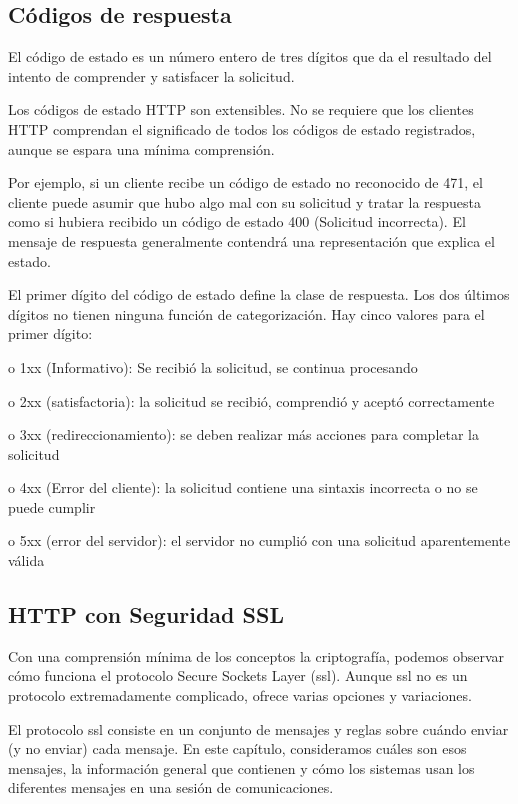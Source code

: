 \subsection{Códigos de respuesta} 
El código de estado es un número entero de tres dígitos que da el 
resultado del intento de comprender y satisfacer la solicitud.

   Los códigos de estado HTTP son extensibles. No se requiere que los
    clientes HTTP comprendan el significado de todos los códigos de
     estado registrados, aunque se espara una mínima comprensión.

   Por ejemplo, si un cliente recibe un código de estado no reconocido
    de 471, el cliente puede asumir que hubo algo mal con su solicitud
     y tratar la respuesta como si hubiera recibido un código de estado
      400 (Solicitud incorrecta). El mensaje de respuesta generalmente 
      contendrá una representación que explica el estado.

   El primer dígito del código de estado define la clase de respuesta.
    Los dos últimos dígitos no tienen ninguna función de categorización.
     Hay cinco valores para el primer dígito:

   o 1xx (Informativo): Se recibió la solicitud, se continua procesando

   o 2xx (satisfactoria): la solicitud se recibió, comprendió y 
   aceptó correctamente

   o 3xx (redireccionamiento): se deben realizar más acciones para
    completar la solicitud

   o 4xx (Error del cliente): la solicitud contiene una sintaxis
    incorrecta o no se puede cumplir

      o 5xx (error del servidor): el servidor no cumplió con una
       solicitud aparentemente válida


\subsection{HTTP con Seguridad SSL} 

Con una comprensión mínima de los conceptos la criptografía, podemos 
observar cómo funciona el protocolo Secure Sockets Layer (ssl). Aunque
 ssl no es un protocolo extremadamente complicado, ofrece varias 
 opciones y variaciones.

El protocolo ssl consiste en un conjunto de mensajes y reglas sobre
 cuándo enviar (y no enviar) cada mensaje. En este capítulo, consideramos 
 cuáles son esos mensajes, la información general que contienen y 
 cómo los sistemas usan los diferentes mensajes en una sesión de
  comunicaciones.


